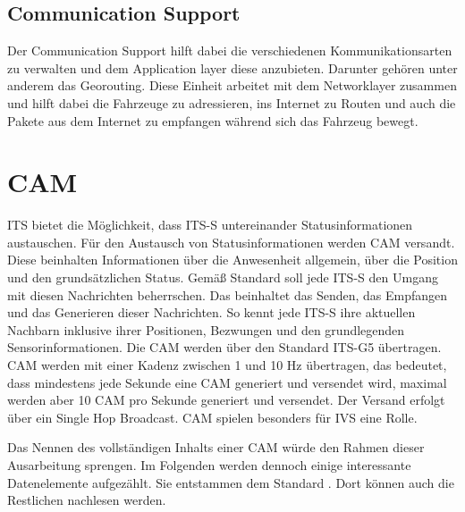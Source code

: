 \subsection{Communication Support}
Der Communication Support hilft dabei die verschiedenen Kommunikationsarten zu verwalten und dem Application layer diese anzubieten. Darunter gehören unter anderem das Georouting. Diese Einheit arbeitet mit dem Networklayer zusammen und hilft dabei die Fahrzeuge zu adressieren, ins Internet zu Routen und auch die Pakete aus dem Internet zu empfangen während sich das Fahrzeug bewegt. 

\section{CAM\label{sec:cam}}
\ac{ITS} bietet die Möglichkeit, dass \ac{ITS-S} untereinander Statusinformationen austauschen. Für den Austausch von Statusinformationen werden \ac{CAM} versandt. Diese beinhalten Informationen über die Anwesenheit allgemein, über die Position und den grundsätzlichen Status. Gemäß Standard \cite{ts102637-2} soll jede \ac{ITS-S} den Umgang mit diesen Nachrichten beherrschen. Das beinhaltet das Senden, das Empfangen und das Generieren dieser Nachrichten. So kennt jede \ac{ITS-S} ihre aktuellen Nachbarn inklusive ihrer Positionen, Bezwungen und den grundlegenden Sensorinformationen. Die \ac{CAM} werden über den Standard \ac{ITS-G5} übertragen. \ac{CAM} werden mit einer Kadenz zwischen 1 und 10 Hz übertragen, das bedeutet, dass mindestens jede Sekunde eine \ac{CAM} generiert und versendet wird, maximal werden aber 10 \ac{CAM} pro Sekunde generiert und versendet. Der Versand erfolgt über ein Single Hop Broadcast. \ac{CAM} spielen besonders für \ac{IVS} eine Rolle.


Das Nennen des vollständigen Inhalts einer \ac{CAM} würde den Rahmen dieser Ausarbeitung sprengen. Im Folgenden werden dennoch einige interessante Datenelemente aufgezählt. Sie entstammen dem Standard \cite{ts102637-2}. Dort können auch die Restlichen nachlesen werden.


